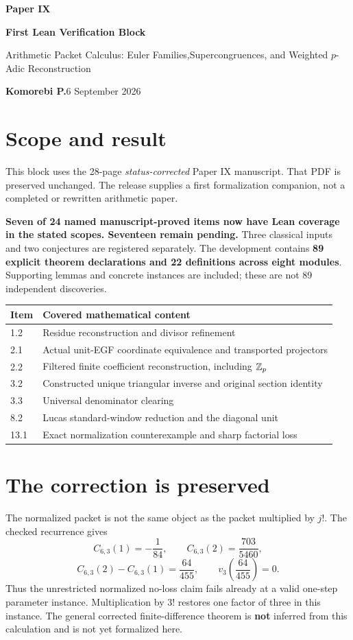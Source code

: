 \documentclass[11pt]{article}
\begin{document}
{\LARGE\bfseries\color{ink}Paper IX}\par
{\Large\bfseries First Lean Verification Block}\par
{\large Arithmetic Packet Calculus: Euler Families,\newline Supercongruences, and Weighted $p$-Adic Reconstruction}\par
\textbf{Komorebi P.}\hfill 6 September 2026
\bigskip
\section*{Scope and result}
This block uses the 28-page \emph{status-corrected} Paper IX manuscript. That PDF is preserved unchanged. The release supplies a first formalization companion, not a completed or rewritten arithmetic paper.

\textbf{Seven of 24 named manuscript-proved items now have Lean coverage in the stated scopes. Seventeen remain pending.} Three classical inputs and two conjectures are registered separately. The development contains \textbf{89 explicit theorem declarations and 22 definitions across eight modules}. Supporting lemmas and concrete instances are included; these are not 89 independent discoveries.

\begin{center}
\begin{tabular}{@{}p{}p{}@{}}
\toprule
Item & Covered mathematical content\\\midrule
1.2 & Residue reconstruction and divisor refinement\\
2.1 & Actual unit-EGF coordinate equivalence and transported projectors\\
2.2 & Filtered finite coefficient reconstruction, including $\mathbb Z_p$\\
3.2 & Constructed unique triangular inverse and original section identity\\
3.3 & Universal denominator clearing\\
8.2 & Lucas standard-window reduction and the diagonal unit\\
13.1 & Exact normalization counterexample and sharp factorial loss\\
\bottomrule
\end{tabular}
\end{center}

\section*{The correction is preserved}
The normalized packet is not the same object as the packet multiplied by $j!$. The checked recurrence gives
\[
 C_{6,3}(1)=-\frac1{84},\qquad C_{6,3}(2)=\frac{703}{5460},
\]
\[
 C_{6,3}(2)-C_{6,3}(1)=\frac{64}{455},\qquad
 v_3\!\left(\frac{64}{455}\right)=0.
\]
Thus the unrestricted normalized no-loss claim fails already at a valid one-step parameter instance. Multiplication by $3!$ restores one factor of three in this instance. The general corrected finite-difference theorem is \textbf{not} inferred from this calculation and is not yet formalized here.
\end{document}
